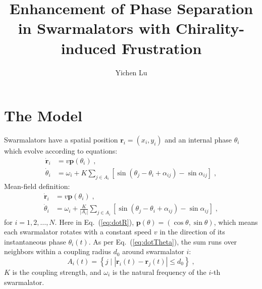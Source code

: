 \documentclass{article}
\title{\textbf{Enhancement of Phase Separation in Swarmalators with Chirality-induced Frustration}}
\author{Yichen Lu}
\begin{document}
\maketitle

\tableofcontents

\newpage
\section{\label{sec:model}The Model}

Swarmalators have a spatial position $\mathbf{r}_i=\left( x_i, y_i \right)$ and an internal phase $\theta_i$ which evolve according to equations:
\begin{subequations}
    \label{eq:totalDynamics}
    \begin{align}
        \dot{\mathbf{r}}_i&=v\mathbf{p}\left( \theta _i \right)\label{eq:dotR}\;,\\
        \dot{\theta}_i&=\omega _i+K\sum_{j\in A_i}{\left[ \sin \left( \theta _j-\theta _i+\alpha _{ij} \right) -\sin \alpha _{ij} \right]}\label{eq:dotTheta}\;,
    \end{align}
\end{subequations}
\color{blue}
Mean-field definition:
\begin{subequations}
    \label{eq:totalDynamicsMeanField}
    \begin{align}
        \dot{\mathbf{r}}_i&=v\mathbf{p}\left( \theta _i \right)\label{eq:dotR}\;,\\
        \dot{\theta}_i&=\omega _i+\frac{K}{\left| A_i \right|}\sum_{j\in A_i}{\left[ \sin \left( \theta _j-\theta _i+\alpha _{ij} \right) -\sin \alpha _{ij} \right]}\label{eq:dotTheta}\;,
    \end{align}
\end{subequations}
\color{black}
for $i=1,2,\ldots,N$. Here in Eq.~(\ref{eq:dotR}), $\mathbf{p}\left( \theta \right) =\left( \cos \theta ,\sin \theta \right)$, which means each swarmalator rotates with a constant speed $v$ in the direction of its instantaneous phase $\theta_i (t)$. As per Eq.~(\ref{eq:dotTheta}), the sum runs over neighbors within a coupling radius $d_0$ around swarmalator $i$:
\begin{equation}
    A_i\left( t \right) =\left\{ j\mid \left| \mathbf{r}_i\left( t \right) -\mathbf{r}_j\left( t \right) \right|\leqslant d_0 \right\} \;,
\end{equation}
$K$ is the coupling strength, and $\omega_i$ is the natural frequency of the $i$-th swarmalator. 
\end{document}
